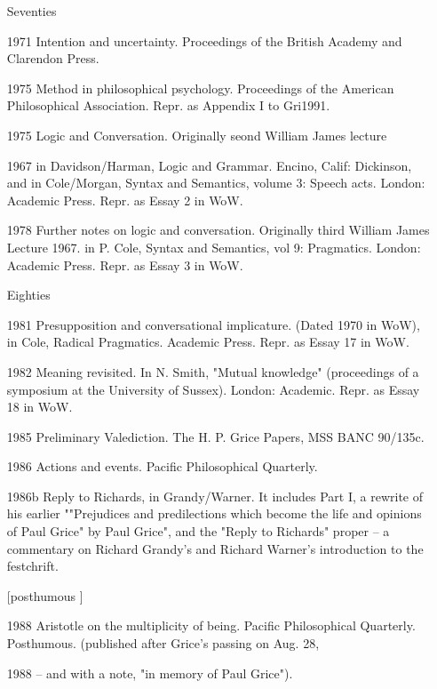 \documentclass[10pt,titlepage]{book}
\begin{document}
\begin{itemize}
\item[Seventies]

\item[1971] Intention and uncertainty. Proceedings of the British Academy and
Clarendon Press.

\item[1975] Method in philosophical psychology. Proceedings of the American
Philosophical Association. Repr. as Appendix I to Gri1991.

\item[1975] Logic and Conversation. Originally seond William James lecture
\item[1967] in Davidson/Harman, Logic and Grammar. Encino, Calif: Dickinson,
and in Cole/Morgan, Syntax and Semantics, volume 3: Speech acts.
London: Academic Press. Repr. as Essay 2 in WoW.

\item[1978] Further notes on logic and conversation. Originally third William
James Lecture 1967. in P. Cole, Syntax and Semantics, vol 9:
Pragmatics. London: Academic Press. Repr. as Essay 3 in WoW.

\item[Eighties]

\item[1981] Presupposition and conversational implicature. (Dated 1970 in
WoW), in Cole, Radical Pragmatics. Academic Press. Repr. as Essay 17 in
WoW.

\item[1982] Meaning revisited. In N. Smith, "Mutual knowledge" (proceedings
of a symposium at the University of Sussex). London: Academic. Repr. as
Essay 18 in WoW.

\item[1985] Preliminary Valediction. The H. P. Grice Papers, MSS BANC 90/135c.

\item[1986] Actions and events. Pacific Philosophical Quarterly.

\item[1986b] Reply to Richards, in Grandy/Warner. It includes Part I, a
rewrite of his earlier ""Prejudices and predilections which become the
life and opinions of Paul Grice" by Paul Grice", and the "Reply to
Richards" proper -- a commentary on Richard Grandy's and Richard
Warner's introduction to the festchrift.

\item[[posthumous]]

\item[1988] Aristotle on the multiplicity of being. Pacific Philosophical
Quarterly. Posthumous. (published after Grice's passing on Aug. 28,
\item[1988] -- and with a note, "in memory of Paul Grice").


\end{itemize}
\end{document}
